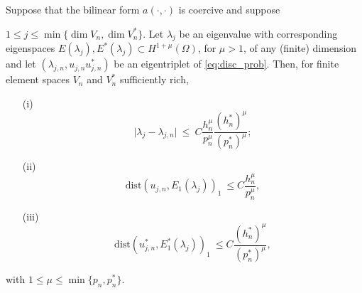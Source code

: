 \documentclass[smallextended]{svjour3}
\begin{document}
\begin{lemma}
\label{lm:adj}
Suppose  that the bilinear form $a(\cdot,\cdot)$ is coercive and suppose

$ 1 \leq j\leq \min\{\dim V_n,\dim V_n^*\}$. Let
$\lambda_j$ be an eigenvalue with
corresponding eigenspaces $E(\lambda_j),E^*(\lambda_j)\subset H^{1+\mu}(\Omega)$, for $\mu>1$, of any (finite) dimension  and
let $(\lambda_{j,n},u_{j,n}u_{j,n}^*)$ be an  eigentriplet  of \eqref{eq:disc_prob}.
Then, for finite element spaces $V_n$ and $V_n^*$ sufficiently rich,
\begin{itemize}
\item[(i)] 
\begin{equation}\label{eq:supereig}
\vert \lambda_j - \lambda_{j,n} \vert \ \leq \ C
\frac{h_n^{\mu} }{p_n^{\mu}}\frac{(h_n^*)^{\mu} }{(p_n^*)^{\mu}};  
\end{equation}
\item[(ii)] 
\begin{equation}
\label{eq:energy} \mathrm{dist}(
u_{j,n},E_1(\lambda_j))_{1} \ \leq
C \frac{h_n^{\mu}}{p_n^{\mu}}, 
\end{equation}
\item[(iii)]
\begin{equation}
\label{eq:energy_dual} \mathrm{dist}(
u_{j,n}^*,E_1^*(\lambda_j))_{1} \ \leq
C \frac{(h_n^*)^{\mu}}{(p_n^*)^{\mu}}, 
\end{equation}
\end{itemize}
with $1\leq \mu\leq \min\{p_n,p_n^*\}$.
\end{lemma}
\end{document}
